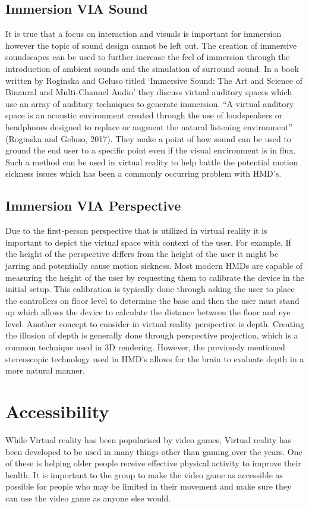 \subsection{Immersion VIA Sound}
It is true that a focus on interaction and visuals is important for immersion however the topic of sound design cannot be left out. The creation of immersive soundscapes can be used to further increase the feel of immersion through the introduction of ambient sounds and the simulation of surround sound. In a book written by Roginska and Geluso titled ‘Immersive Sound: The Art and Science of Binaural and Multi-Channel Audio’ they discuss virtual auditory spaces which use an array of auditory techniques to generate immersion. “A virtual auditory space is an acoustic environment created through the use of loudspeakers or headphones designed to replace or augment the natural listening environment” (Roginska and Geluso, 2017). They make a point of how sound can be used to ground the end user to a specific point even if the visual environment is in flux. Such a method can be used in virtual reality to help battle the potential motion sickness issues which has been a commonly occurring problem with HMD’s.  

\subsection{Immersion VIA Perspective}
Due to the first-person perspective that is utilized in virtual reality it is important to depict the virtual space with context of the user. For example, If the height of the perspective differs from the height of the user it might be jarring and potentially cause motion sickness. Most modern HMDs are capable of measuring the height of the user by requesting them to calibrate the device in the initial setup. This calibration is typically done through asking the user to place the controllers on floor level to determine the base and then the user must stand up which allows the device to calculate the distance between the floor and eye level. Another concept to consider in virtual reality perspective is depth. Creating the illusion of depth is generally done through perspective projection, which is a common technique used in 3D rendering. However, the previously mentioned stereoscopic technology used in HMD’s allows for the brain to evaluate depth in a more natural manner. 

\section{Accessibility}
While Virtual reality has been popularised by video games, Virtual reality has been developed to be used in many things other than gaming over the years. One of these is helping older people receive effective physical activity to improve their health. It is important to the group to make the video game as accessible as possible for people who may be limited in their movement and make sure they can use the video game as anyone else would. 

